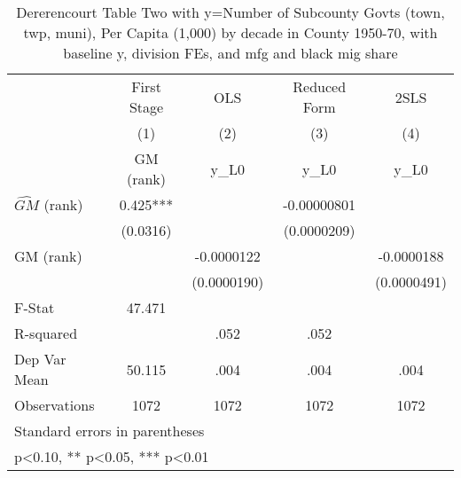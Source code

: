 \begin{table}[htbp]\centering
\def\sym#1{\ifmmode^{#1}\else\(^{#1}\)\fi}
\caption{Dererencourt Table Two with y=Number of Subcounty Govts (town, twp, muni), Per Capita (1,000) by decade in County 1950-70, with baseline y, division FEs, and mfg and black mig share}
\begin{tabular}{l*{4}{c}}
\toprule
                    & First Stage   &         OLS   &Reduced Form   &        2SLS   \\
                    &\multicolumn{1}{c}{(1)}&\multicolumn{1}{c}{(2)}&\multicolumn{1}{c}{(3)}&\multicolumn{1}{c}{(4)}\\
                    &\multicolumn{1}{c}{GM  (rank)}&\multicolumn{1}{c}{y\_L0}&\multicolumn{1}{c}{y\_L0}&\multicolumn{1}{c}{y\_L0}\\
\midrule
$\hat{GM}$ (rank)   &       0.425***&               & -0.00000801   &               \\
                    &    (0.0316)   &               & (0.0000209)   &               \\
\addlinespace
GM  (rank)          &               &  -0.0000122   &               &  -0.0000188   \\
                    &               & (0.0000190)   &               & (0.0000491)   \\
\midrule
F-Stat              &      47.471   &               &               &               \\
R-squared           &               &        .052   &        .052   &               \\
Dep Var Mean        &      50.115   &        .004   &        .004   &        .004   \\
Observations        &        1072   &        1072   &        1072   &        1072   \\
\bottomrule
\multicolumn{5}{l}{\footnotesize Standard errors in parentheses}\\
\multicolumn{5}{l}{\footnotesize * p<0.10, ** p<0.05, *** p<0.01}\\
\end{tabular}
\end{table}
